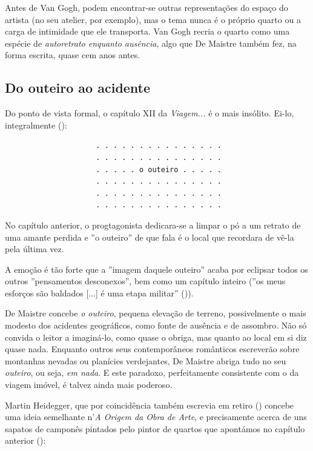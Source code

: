 \documentclass[12pt]{article}
\begin{document}
Antes de Van Gogh, podem encontrar-se outras representações do espaço
do artista (no seu atelier, por exemplo), mas o tema nunca é o próprio
quarto ou a carga de intimidade que ele transporta. Van Gogh recria o
quarto como uma espécie de \emph{autoretrato enquanto ausência}, algo
que De Maistre também fez, na forma escrita, quase cem anos antes.

\subsection{Do outeiro ao acidente}

Do ponto de vista formal, o capítulo XII da \emph{Viagem...} é o mais
insólito. Ei-lo, integralmente (\cite[p.36]{demaistre}):

\begin{center}
\begin{verbatim}
                     . . . . . . . . . . . . . . .
                     . . . . . . . . . . . . . . .
                     . . . . . o outeiro . . . . .
                     . . . . . . . . . . . . . . .
                     . . . . . . . . . . . . . . .
                     . . . . . . . . . . . . . . .
\end{verbatim}
\end{center}

No capítulo anterior, o progtagonista dedicara-se a limpar o pó a um
retrato de uma amante perdida e ''o outeiro'' de que fala é o local
que recordara de vê-la pela última vez.

A emoção é tão forte que a ''imagem daquele outeiro'' acaba por
eclipsar todos os outros ''pensamentos desconexos'', bem como um
capítulo inteiro (''os meus esforços são baldados [...] é uma etapa
militar'' (\cite[p.36,p.39]{demaistre})).

De Maistre concebe \emph{o outeiro}, pequena elevação de terreno,
possivelmente o mais modesto dos acidentes geográficos, como fonte de
ausência e de assombro. Não só convida o leitor a imaginá-lo, como
quase o obriga, mas quanto ao local em si diz quase nada. Enquanto
outros seus contemporâneos românticos escreverão sobre montanhas
nevadas ou planícies verdejantes, De Maistre abriga tudo no seu
\emph{outeiro}, ou seja, \emph{em nada}. E este paradoxo,
perfeitamente consistente com o da viagem imóvel, é talvez ainda mais
poderoso.

Martin Heidegger, que por coincidência também escrevia em retiro
(\cite{heideggerhut}) concebe uma ideia semelhante n'\emph{A Origem da
  Obra de Arte}, e precisamente acerca de uns sapatos de camponês
pintados pelo pintor de quartos que apontámos no capítulo anterior
(\cite[p.24]{heidegger}):
\end{document}

